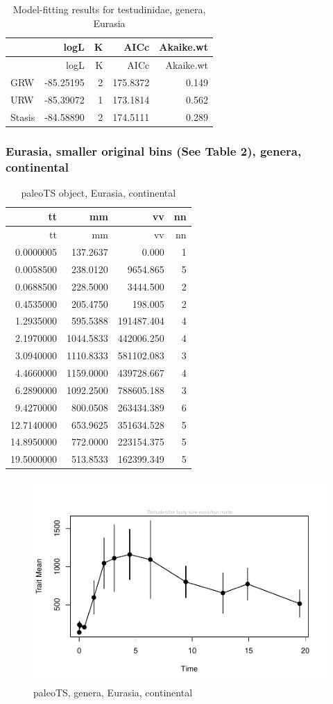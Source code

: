 \documentclass[]{article}
\begin{document}
\begin{longtable}[]{@{}lrrrr@{}}
\caption{Model-fitting results for testudinidae, genera,
Eurasia}\tabularnewline
\toprule
& logL & K & AICc & Akaike.wt\tabularnewline
\midrule
\endfirsthead
\toprule
& logL & K & AICc & Akaike.wt\tabularnewline
\midrule
\endhead
GRW & -85.25195 & 2 & 175.8372 & 0.149\tabularnewline
URW & -85.39072 & 1 & 173.1814 & 0.562\tabularnewline
Stasis & -84.58890 & 2 & 174.5111 & 0.289\tabularnewline
\bottomrule
\end{longtable}

\newpage 

\subsubsection{Eurasia, smaller original bins (See Table 2), genera,
continental}\label{eurasia-smaller-original-bins-see-table-2-genera-continental}

\begin{longtable}[]{@{}rrrr@{}}
\caption{paleoTS object, Eurasia, continental}\tabularnewline
\toprule
tt & mm & vv & nn\tabularnewline
\midrule
\endfirsthead
\toprule
tt & mm & vv & nn\tabularnewline
\midrule
\endhead
0.0000005 & 137.2637 & 0.000 & 1\tabularnewline
0.0058500 & 238.0120 & 9654.865 & 5\tabularnewline
0.0688500 & 228.5000 & 3444.500 & 2\tabularnewline
0.4535000 & 205.4750 & 198.005 & 2\tabularnewline
1.2935000 & 595.5388 & 191487.404 & 4\tabularnewline
2.1970000 & 1044.5833 & 442006.250 & 4\tabularnewline
3.0940000 & 1110.8333 & 581102.083 & 3\tabularnewline
4.4660000 & 1159.0000 & 439728.667 & 4\tabularnewline
6.2890000 & 1092.2500 & 788605.188 & 3\tabularnewline
9.4270000 & 800.0508 & 263434.389 & 6\tabularnewline
12.7140000 & 653.9625 & 351634.528 & 5\tabularnewline
14.8950000 & 772.0000 & 223154.375 & 5\tabularnewline
19.5000000 & 513.8533 & 162399.349 & 5\tabularnewline
\bottomrule
\end{longtable}

\begin{figure}[htbp]
\centering
\includegraphics{MA_JJ_files/figure-latex/pTSEsC-1.pdf}
\caption{paleoTS, genera, Eurasia, continental}
\end{figure}
\end{document}
